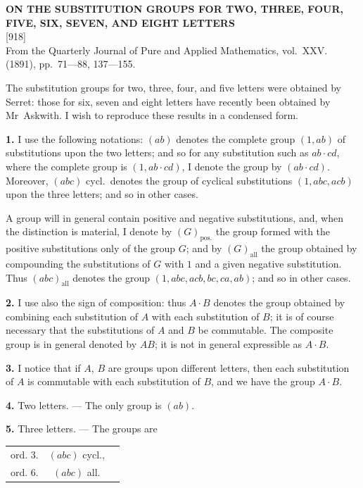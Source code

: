 \documentclass[11pt,a4paper]{article}
\newcommand{\paper}[4]{%
  \newpage
  \begin{center}
    {\large\bfseries #2}\\[0.5em]
    {\small [#1]}\\[0.3em]
    {\small #3}
  \end{center}
  \vspace{0.5em}
}
\begin{document}
\newpage
\paper{918}{ON THE SUBSTITUTION GROUPS FOR TWO, THREE, FOUR, FIVE, SIX, SEVEN, AND EIGHT LETTERS}{From the Quarterly Journal of Pure and Applied Mathematics, vol.~XXV. (1891), pp.~71---88, 137---155.}{}

The substitution groups for two, three, four, and five letters were obtained by Serret: those for six, seven and eight letters have recently been obtained by Mr~Askwith. I wish to reproduce these results in a condensed form.

\vspace{0.5em}
\textbf{1.} I use the following notations: $(ab)$ denotes the complete group $(1, ab)$ of substitutions upon the two letters; and so for any substitution such as $ab \cdot cd$, where the complete group is $(1, ab \cdot cd)$, I denote the group by $(ab \cdot cd)$. Moreover, $(abc)$ cycl.\ denotes the group of cyclical substitutions $(1, abc, acb)$ upon the three letters; and so in other cases.

A group will in general contain positive and negative substitutions, and, when the distinction is material, I denote by $(G)_{\text{pos.}}$ the group formed with the positive substitutions only of the group $G$; and by $(G)_{\text{all}}$ the group obtained by compounding the substitutions of $G$ with $1$ and a given negative substitution. Thus $(abc)_{\text{all}}$ denotes the group $(1, abc, acb, bc, ca, ab)$; and so in other cases.

\vspace{0.5em}
\textbf{2.} I use also the sign of composition: thus $A \cdot B$ denotes the group obtained by combining each substitution of $A$ with each substitution of $B$; it is of course necessary that the substitutions of $A$ and $B$ be commutable. The composite group is in general denoted by $AB$; it is not in general expressible as $A \cdot B$.

\vspace{0.5em}
\textbf{3.} I notice that if $A$, $B$ are groups upon different letters, then each substitution of $A$ is commutable with each substitution of $B$, and we have the group $A \cdot B$.

\vspace{0.5em}
\textbf{4.} Two letters. --- The only group is $(ab)$.

\vspace{0.5em}
\textbf{5.} Three letters. --- The groups are
\begin{center}
\begin{tabular}{ccl}
ord.  3. & $(abc)$ cycl., \\
ord.  6. & $(abc)$ all.
\end{tabular}
\end{center}
\end{document}
